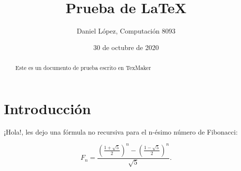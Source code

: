 \documentclass[12pt, letterpaper]{article}
\title{Prueba de \LaTeX{}}
\author{Daniel López, Computación 8093}
\date{30 de octubre de 2020}
\begin{document}
\maketitle

\begin{abstract}
Este es un documento de prueba escrito en TexMaker
\end{abstract}

\section{Introducción}
¡Hola!, les dejo una fórmula no recursiva para el n-ésimo número de Fibonacci:

\[ F_n = \frac{\left(\frac{1+\sqrt{5}}{2}\right)^n - \left(\frac{1-\sqrt{5}}{2}\right)^n}{\sqrt{5}}. \]
\end{document}
